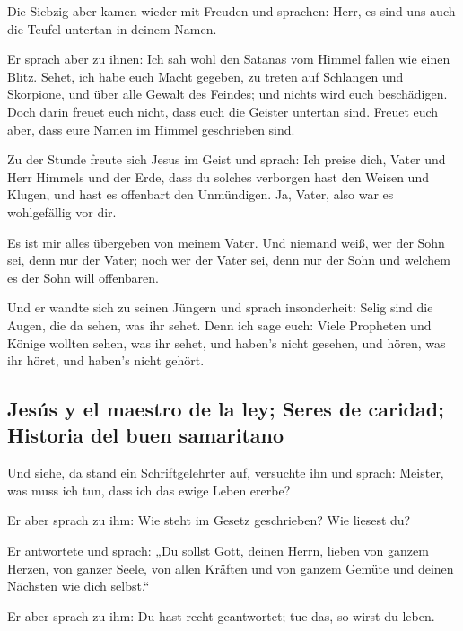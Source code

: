  Die Siebzig aber kamen wieder mit Freuden und sprachen:
Herr, es sind uns auch die Teufel untertan in deinem Namen.

 Er sprach aber zu ihnen: Ich sah wohl den Satanas vom
Himmel fallen wie einen Blitz.  Sehet, ich habe euch
Macht gegeben, zu treten auf Schlangen und Skorpione, und über alle
Gewalt des Feindes; und nichts wird euch beschädigen. 
Doch darin freuet euch nicht, dass euch die Geister untertan sind.
Freuet euch aber, dass eure Namen im Himmel geschrieben sind.

 Zu der Stunde freute sich Jesus im Geist und sprach: Ich
preise dich, Vater und Herr Himmels und der Erde, dass du solches
verborgen hast den Weisen und Klugen, und hast es offenbart den
Unmündigen. Ja, Vater, also war es wohlgefällig vor dir.

 Es ist mir alles übergeben von meinem Vater. Und niemand
weiß, wer der Sohn sei, denn nur der Vater; noch wer der Vater sei, denn
nur der Sohn und welchem es der Sohn will offenbaren.

 Und er wandte sich zu seinen Jüngern und sprach
insonderheit: Selig sind die Augen, die da sehen, was ihr sehet.
 Denn ich sage euch: Viele Propheten und Könige wollten
sehen, was ihr sehet, und haben's nicht gesehen, und hören, was ihr
höret, und haben's nicht gehört.

\hypertarget{jesuxfas-y-el-maestro-de-la-ley-seres-de-caridad-historia-del-buen-samaritano}{%
\subsection{Jesús y el maestro de la ley; Seres de caridad; Historia del
buen
samaritano}\label{jesuxfas-y-el-maestro-de-la-ley-seres-de-caridad-historia-del-buen-samaritano}}

 Und siehe, da stand ein Schriftgelehrter auf, versuchte
ihn und sprach: Meister, was muss ich tun, dass ich das ewige Leben
ererbe?

 Er aber sprach zu ihm: Wie steht im Gesetz geschrieben?
Wie liesest du?

 Er antwortete und sprach: „Du sollst Gott, deinen Herrn,
lieben von ganzem Herzen, von ganzer Seele, von allen Kräften und von
ganzem Gemüte und deinen Nächsten wie dich selbst.``

 Er aber sprach zu ihm: Du hast recht geantwortet; tue
das, so wirst du leben.

